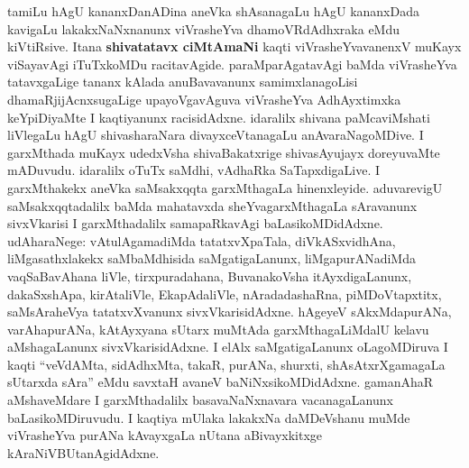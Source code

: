 \vskip 2pt

tamiLu hAgU kananxDanADina aneVka shAsanagaLu hAgU kananxDada kavigaLu lakakxNaNxnanunx viVrasheYva dhamoVRdAdhxraka eMdu kiVtiRsive. Itana \textbf{shivatatavx ciMtAmaNi} kaqti viVrasheYvavanenxV muKayx viSayavAgi iTuTxkoMDu racitavAgide. paraMparAgatavAgi baMda viVrasheYva tatavxgaLige tananx kAlada anuBavavanunx samimxlanagoLisi dhamaRjijAcnxsugaLige upayoVgavAguva viVrasheYva AdhAyxtimxka \hbox{keYpiDiyaMte} I kaqtiyanunx racisidAdxne. idaralilx shivana paMcaviMshati liVlegaLu hAgU shivasharaNara divayxceVtanagaLu anAvaraNa\-goMDive. I garxMthada muKayx udedxVsha shivaBakatxrige shivasAyujayx doreyuvaMte mADuvudu. idaralilx oTuTx  saMdhi,  vAdhaRka SaTapxdigaLive. I garxMthakekx aneVka saMsakxqqta garxMthagaLa hinenxleyide. aduvarevigU saMsakxqqtadalilx baMda mahatavxda sheYvagarxMthagaLa sAravanunx sivxVkarisi I garxMthadalilx samapaRkavAgi baLasikoMDidAdxne. udAharaNege: vAtulAgamadiMda tatatxvXpaTala, diVkASx\-vidhAna, liMgasathxlakekx saMbaMdhisida saMgatigaLanunx, liMgapurANadiMda vaqSaBavAhana liVle, tirxpuradahana, BuvanakoVsha itAyxdi\-gaLanunx, dakaSxshApa, kirAtaliVle, EkapAdaliVle, nAradadashaRna, piMDoVtapxtitx, saMsAraheVya tatatxvXvanunx sivxVkarisidAdxne. hAgeyeV sAkxMda\-purANa, varAhapurANa, kAtAyxyana sUtarx muMtAda garxMthagaLiMdalU kelavu aMshagaLanunx sivxVkarisidAdxne. I elAlx saMgatigaLanunx oLagoMDiruva I kaqti ``veVdAMta, sidAdhxMta, takaR, purANa, shurxti, shAsAtxrXgamagaLa sUtarxda sAra'' eMdu savxtaH avaneV baNiNxsi\-koMDidAdxne. gamanAhaR aMshaveMdare I garxMthadalilx basavaNaNxnavara vacanagaLanunx baLasikoMDiruvudu. I kaqtiya mUlaka lakakxNa daMDeVshanu muMde viVrasheYva purANa kAvayxgaLa nUtana aBivayxkitxge kAraNiVBUtanAgidAdxne.

